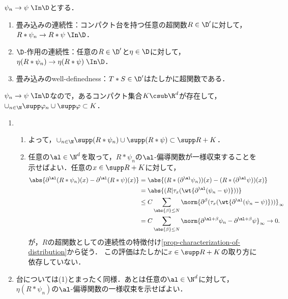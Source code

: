 \documentclass[uplatex,dvipdfmx]{jsreport}
\begin{document}
\begin{lemma}\label{lemma-well-definedness-of-convolution-between-distributions}
    $\psi_n\to\psi\;\In\D$とする．
    \begin{enumerate}
        \item 畳み込みの連続性：コンパクト台を持つ任意の超関数$R\in\D'$に対して，$R*\psi_n\to R*\psi\;\In\D$．
        \item $\D$-作用の連続性：任意の$R\in\D'$と$\eta\in\D$に対して，$\eta(R*\psi_n)\to\eta(R*\psi)\;\In\D$．
        \item 畳み込みのwell-definedness：$T*S\in\D'$はたしかに超関数である．
    \end{enumerate}
\end{lemma}
\begin{Proof}
    $\psi_n\to\psi\;\In\D$なので，あるコンパクト集合$K\csub\R^d$が存在して，$\cup_{n\in\N}\supp\varphi_n\cup\supp\varphi\subset K$．
    \begin{enumerate}
        \item 
        \begin{enumerate}[{Step}1]
            \item 
            よって，$\cup_{n\in\N}\supp(R*\psi_n)\cup\supp(R*\psi)\subset\supp R+K$．
            \item 任意の$\al\in\N^d$を取って，$R*\psi_n$の$\al$-偏導関数が一様収束することを示せばよい．任意の$x\in\supp R+K$に対して，
            \begin{align*}
                \abs{\partial^\al(R*\psi_n)(x)-\partial^\al(R*\psi)(x)}&=\abs{(R*(\partial^\al\psi_n))(x)-(R*(\partial^\al\psi))(x)}\\
                &=\abs{(R|\tau_x(\wt{\partial^\al(\psi_n-\psi)}))}\\
                &\le C\sum_{\abs{\beta}\le N}\norm{\partial^\beta(\tau_x(\wt{\partial^\al(\psi_n-\psi)}))}_\infty\\
                &=C\sum_{\abs{\beta}\le N}\norm{\partial^{\al+\beta}\psi_n-\partial^{\al+\beta}\psi}_\infty\to0.
            \end{align*}
            が，$R$の超関数としての連続性の特徴付け\ref{prop-characterization-of-distribution}から従う．
            この評価はたしかに$x\in\supp R+K$の取り方に依存していない．
        \end{enumerate}
        \item 台については(1)とまったく同様．あとは任意の$\al\in\N^d$に対して，$\eta(R*\psi_n)$の$\al$-偏導関数の一様収束を示せばよい．

\end{enumerate}
\end{Proof}
\end{document}
